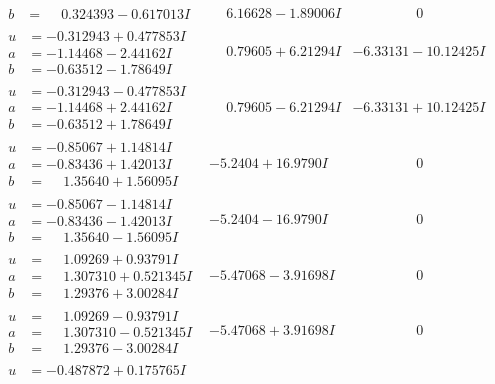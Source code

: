 \documentclass[1p]{elsarticle_modified}
\theoremstyle{definition}
\begin{document}
$$\begin{array}{c|c|c}
\begin{aligned}
b &= \phantom{-}0.324393 - 0.617013 I\end{aligned}
 & \phantom{-}6.16628 - 1.89006 I & \phantom{-0.000000 } 0 \\ \hline\begin{aligned}
u &= -0.312943 + 0.477853 I \\
a &= -1.14468 - 2.44162 I \\
b &= -0.63512 - 1.78649 I\end{aligned}
 & \phantom{-}0.79605 + 6.21294 I & -6.33131 - 10.12425 I \\ \hline\begin{aligned}
u &= -0.312943 - 0.477853 I \\
a &= -1.14468 + 2.44162 I \\
b &= -0.63512 + 1.78649 I\end{aligned}
 & \phantom{-}0.79605 - 6.21294 I & -6.33131 + 10.12425 I \\ \hline\begin{aligned}
u &= -0.85067 + 1.14814 I \\
a &= -0.83436 + 1.42013 I \\
b &= \phantom{-}1.35640 + 1.56095 I\end{aligned}
 & -5.2404 + 16.9790 I & \phantom{-0.000000 } 0 \\ \hline\begin{aligned}
u &= -0.85067 - 1.14814 I \\
a &= -0.83436 - 1.42013 I \\
b &= \phantom{-}1.35640 - 1.56095 I\end{aligned}
 & -5.2404 - 16.9790 I & \phantom{-0.000000 } 0 \\ \hline\begin{aligned}
u &= \phantom{-}1.09269 + 0.93791 I \\
a &= \phantom{-}1.307310 + 0.521345 I \\
b &= \phantom{-}1.29376 + 3.00284 I\end{aligned}
 & -5.47068 - 3.91698 I & \phantom{-0.000000 } 0 \\ \hline\begin{aligned}
u &= \phantom{-}1.09269 - 0.93791 I \\
a &= \phantom{-}1.307310 - 0.521345 I \\
b &= \phantom{-}1.29376 - 3.00284 I\end{aligned}
 & -5.47068 + 3.91698 I & \phantom{-0.000000 } 0 \\ \hline\begin{aligned}
u &= -0.487872 + 0.175765 I \\

\end{aligned}
\end{array}$$
\end{document}
